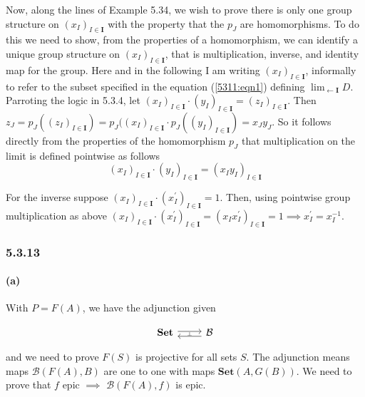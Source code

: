 \documentclass{article}
\begin{document}
Now, along the lines of Example 5.34, we wish to prove there is only one group structure on $(x_I)_{I \in \mathbf{I}}$ with the property that the $p_J$ are homomorphisms. To do this we need to show, from the properties of a homomorphism, we can identify a unique group structure on $(x_I)_{I\in\mathbf{I}}$, that is multiplication, inverse, and identity map for the group. Here and in the following I am writing $(x_I)_{I\in\mathbf{I}}$, informally to refer to the subset specified in the equation (\ref{5311:eqn1}) defining $\lim_{\leftarrow \mathbf{I}} D$.  Parroting the logic in 5.3.4, let $(x_I)_{I\in\mathbf{I}} \cdot (y_I)_{I\in\mathbf{I}} = (z_I)_{I\in\mathbf{I}}$. Then $z_J = p_J((z_I)_{I\in\mathbf{I}}) = p_J((x_I)_{I\in\mathbf{I}} \cdot p_J((y_I)_{I\in\mathbf{I}}) = x_Jy_J$. So it follows directly from the properties of the homomorphism $p_J$ that multiplication on the limit is defined pointwise as follows
\begin{equation*}
  (x_I)_{I\in\mathbf{I}} \cdot (y_I)_{I\in\mathbf{I}} = (x_Iy_I)_{I\in\mathbf{I}}
\end{equation*}

For the inverse suppose $(x_I)_{I\in\mathbf{I}} \cdot (x^\prime_I)_{I\in\mathbf{I}} = 1$. Then, using pointwise group multiplication as above $(x_I)_{I\in\mathbf{I}} \cdot (x^\prime_I)_{I\in\mathbf{I}} = (x_Ix^\prime_I)_{I\in\mathbf{I}} = 1 \implies x_I^\prime = x_I^{-1}$.

\subsubsection*{5.3.13}
\paragraph{(a)}

With $P=F(A)$, we have the adjunction given

\begin{equation*}
 \begin{tikzcd}
   \mathbf{Set} \arrow[r,shift left=0.4ex]
    \arrow[r,draw=none,"\scriptscriptstyle\perp" marking] &
    \mathcal{B} \arrow[l,shift left=0.75ex]
  \end{tikzcd}
\end{equation*}

and we need to prove $F(S)$ is projective for all sets $S$. The adjunction means maps $\mathcal{B}(F(A),B)$ are one to one with maps $\mathbf{Set}(A, G(B))$. We need to prove that $f$ epic $\implies$ $\mathcal{B}(F(A),f)$ is epic.
\end{document}
